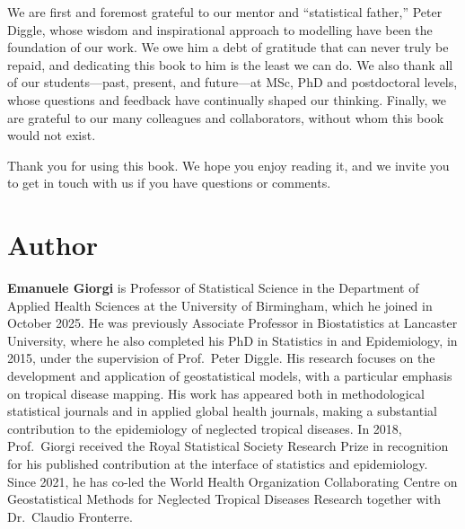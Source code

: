 \documentclass[
  letterpaper,
]{krantz}
\begin{document}
We are first and foremost grateful to our mentor and ``statistical
father,'' Peter Diggle, whose wisdom and inspirational approach to
modelling have been the foundation of our work. We owe him a debt of
gratitude that can never truly be repaid, and dedicating this book to
him is the least we can do. We also thank all of our students---past,
present, and future---at MSc, PhD and postdoctoral levels, whose
questions and feedback have continually shaped our thinking. Finally, we
are grateful to our many colleagues and collaborators, without whom this
book would not exist.

Thank you for using this book. We hope you enjoy reading it, and we
invite you to get in touch with us if you have questions or comments.


\chapter*{Author}\label{author}


\textbf{Emanuele Giorgi} is Professor of Statistical Science in the
Department of Applied Health Sciences at the University of Birmingham,
which he joined in October 2025. He was previously Associate Professor
in Biostatistics at Lancaster University, where he also completed his
PhD in Statistics in and Epidemiology, in 2015, under the supervision of
Prof.~Peter Diggle. His research focuses on the development and
application of geostatistical models, with a particular emphasis on
tropical disease mapping. His work has appeared both in methodological
statistical journals and in applied global health journals, making a
substantial contribution to the epidemiology of neglected tropical
diseases. In 2018, Prof.~Giorgi received the Royal Statistical Society
Research Prize in recognition for his published contribution at the
interface of statistics and epidemiology. Since 2021, he has co-led the
World Health Organization Collaborating Centre on Geostatistical Methods
for Neglected Tropical Diseases Research together with Dr.~Claudio
Fronterre.
\end{document}

